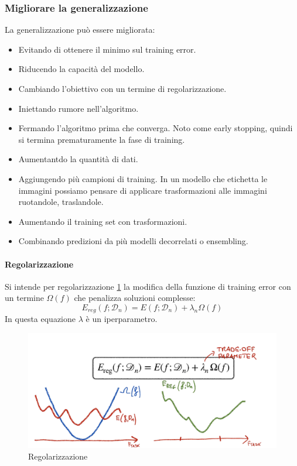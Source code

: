 \subsubsection{Migliorare la generalizzazione}
La generalizzazione pu\`o essere migliorata:
\begin{multicols}{2}
	\begin{itemize}
		\item Evitando di ottenere il minimo sul training error. 
		\item Riducendo la capacit\`a del modello.
		\item Cambiando l'obiettivo con un termine di regolarizzazione.
		\item Iniettando rumore nell'algoritmo. 
		\item Fermando l'algoritmo prima che converga. Noto come early stopping, quindi si termina prematuramente la fase di training.
		\item Aumentantdo la quantit\`a di dati.
		\item Aggiungendo pi\`u campioni di training. In un modello che etichetta le immagini possiamo pensare di applicare trasformazioni alle immagini ruotandole, traslandole.
		\item Aumentando il training set con trasformazioni.
		\item Combinando predizioni da pi\`u modelli decorrelati o ensembling.
	\end{itemize}
\end{multicols}

\paragraph{Regolarizzazione}
Si intende per regolarizzazione \ref{fig:chapter02-07} la modifica della funzione di training error con un termine $\Omega(f)$ che penalizza soluzioni complesse:
$$E_{reg}(f;\mathcal{D}_n)=E(f;\mathcal{D}_n)+\lambda_n\Omega(f)$$
In questa equazione $\lambda$ \`e un iperparametro.

\begin{figure}
	\centering
	\includegraphics[width=0.6\linewidth]{imgs/chapter2/img7}
	\caption{Regolarizzazione}
	\label{fig:chapter02-07}
\end{figure}

